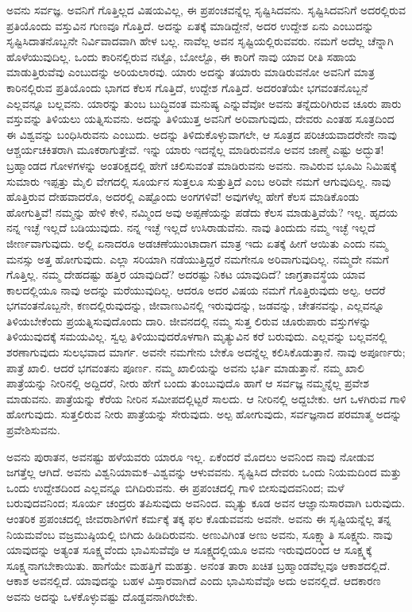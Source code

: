 ಅವನು ಸರ್ವಜ್ಞ. ಅವನಿಗೆ ಗೊತ್ತಿಲ್ಲದ ವಿಷಯವಿಲ್ಲ, ಈ ಪ್ರಪಂಚವನ್ನೆಲ್ಲ ಸೃಷ್ಟಿಸಿದವನು. ಸೃಷ್ಟಿಸಿದವನಿಗೆ ಅದರಲ್ಲಿರುವ ಪ್ರತಿಯೊಂದು ವಸ್ತುವಿನ ಗುಣವೂ ಗೊತ್ತಿದೆ. ಅದನ್ನು ಏತಕ್ಕೆ ಮಾಡಿದ್ದೇನೆ, ಅದರ ಉದ್ದೇಶ ಏನು ಎಂಬುದನ್ನು ಸೃಷ್ಟಿಸಿದಾತನೊಬ್ಬನೇ ನಿರ್ವಿವಾದವಾಗಿ ಹೇಳ ಬಲ್ಲ. ನಾವೆಲ್ಲ ಅವನ ಸೃಷ್ಟಿಯಲ್ಲಿರುವವರು. ನಮಗೆ ಅದೆಲ್ಲ ಚೆನ್ನಾಗಿ ಹೊಳೆಯುವುದಿಲ್ಲ. ಒಂದು ಕಾರಿನಲ್ಲಿರುವ ನಟ್ಟೊ, ಬೋಲ್ಟೊ, ಈ ಕಾರಿಗೆ ನಾವು ಯಾವ ರೀತಿ ಸಹಾಯ ಮಾಡುತ್ತಿರುವೆವು ಎಂಬುದನ್ನು ಅರಿಯಲಾರವು. ಯಾರು ಅದನ್ನು ತಯಾರು ಮಾಡಿರುವನೋ ಅವನಿಗೆ ಮಾತ್ರ ಕಾರಿನಲ್ಲಿರುವ ಪ್ರತಿಯೊಂದು ಭಾಗದ ಕೆಲಸ ಗೊತ್ತಿದೆ, ಉದ್ದೇಶ ಗೊತ್ತಿದೆ. ಅದರಂತೆಯೇ ಭಗವಂತನೊಬ್ಬನೆ ಎಲ್ಲವನ್ನೂ ಬಲ್ಲವನು. ಯಾರನ್ನು ತುಂಬ ಬುದ್ಧಿವಂತ ಮನುಷ್ಯ ಎನ್ನುವೆವೋ ಅವನು ತನ್ನೆದುರಿಗಿರುವ ಚೂರು ಪಾರು ವಸ್ತುವನ್ನು ತಿಳಿಯಲು ಯತ್ನಿಸುವನು. ಅದನ್ನು ತಿಳಿಯುತ್ತ ಅವನಿಗೆ ಅರಿವಾಗುವುದು, ದೇವರು ಎಂತಹ ಸೂತ್ರದಿಂದ ಈ ವಿಶ್ವವನ್ನು ಬಂಧಿಸಿರುವನು ಎಂಬುದು. ಅದನ್ನು ತಿಳಿದುಕೊಳ್ಳುವಾಗಲೇ, ಆ ಸೂತ್ರದ ಪರಿಚಯವಾದರೇನೇ ನಾವು ಆಶ್ಚರ್ಯಚಕಿತರಾಗಿ ಮೂಕರಾಗುತ್ತೇವೆ. ಇನ್ನು ಯಾರು ಇದನ್ನೆಲ್ಲ ಮಾಡಿರುವನೊ ಅವನ ಜಾಣ್ಮೆ ಎಷ್ಟು ಅದ್ಭುತ! ಬ್ರಹ್ಮಾಂಡದ ಗೋಳಗಳನ್ನು ಅಂತರಿಕ್ಷದಲ್ಲಿ ಹೇಗೆ ಚಲಿಸುವಂತೆ ಮಾಡಿರುವನು ಅವನು. ನಾವಿರುವ ಭೂಮಿ ನಿಮಿಷಕ್ಕೆ ಸುಮಾರು ಇಪ್ಪತ್ತು ಮೈಲಿ ವೇಗದಲ್ಲಿ ಸೂರ್ಯನ ಸುತ್ತಲೂ ಸುತ್ತುತ್ತಿದೆ ಎಂಬ ಅರಿವೇ ನಮಗೆ ಆಗುವುದಿಲ್ಲ. ನಾವು ಹೊತ್ತಿರುವ ದೇಹವಾದರೊ, ಅದರಲ್ಲಿ ಎಷ್ಟೊಂದು ಅಂಗಗಳಿವೆ! ಅವುಗಳೆಲ್ಲ ಹೇಗೆ ಕೆಲಸ ಮಾಡಿಕೊಂಡು ಹೋಗುತ್ತಿವೆ! ನಮ್ಮನ್ನು ಹೇಳಿ ಕೇಳಿ, ನಮ್ಮಿಂದ ಅವು ಅಪ್ಪಣೆಯನ್ನು ಪಡೆದು ಕೆಲಸ ಮಾಡುತ್ತಿವೆಯೆ? ಇಲ್ಲ. ಹೃದಯ ನನ್ನ ಇಚ್ಛೆ ಇಲ್ಲದೆ ಬಡಿಯುವುದು. ನನ್ನ ಇಚ್ಛೆ ಇಲ್ಲದೆ ಉಸಿರಾಡುವೆನು. ನಾವು ತಿಂದುದು ನಮ್ಮ ಇಚ್ಛೆ ಇಲ್ಲದೆ ಜೀರ್ಣವಾಗುವುದು. ಅಲ್ಲಿ ಏನಾದರೂ ಅಡಚಣೆಯುಂಟಾದಾಗ ಮಾತ್ರ ಇದು ಏತಕ್ಕೆ ಹೀಗೆ ಆಯಿತು ಎಂದು ನಮ್ಮ ಮನಸ್ಸು ಅತ್ತ ಹೋಗುವುದು. ಎಲ್ಲಾ ಸರಿಯಾಗಿ ನಡೆಯುತ್ತಿದ್ದರೆ ನಮಗೇನೂ ಅರಿವಾಗುವುದಿಲ್ಲ. ನಮ್ಮದೇ ನಮಗೆ ಗೊತ್ತಿಲ್ಲ. ನಮ್ಮ ದೇಹದಷ್ಟು ಹತ್ತಿರ ಯಾವುದಿದೆ? ಅದರಷ್ಟು ನಿಕಟ ಯಾವುದಿದೆ? ಜಾಗ್ರತಾವಸ್ಥೆಯ ಯಾವ ಕಾಲದಲ್ಲಿಯೂ ನಾವು ಅದನ್ನು ಮರೆಯುವುದಿಲ್ಲ. ಆದರೂ ಅದರ ವಿಷಯ ನಮಗೆ ಗೊತ್ತಿರುವುದು ಅಲ್ಪ. ಆದರೆ ಭಗವಂತನೊಬ್ಬನೇ, ಕಣದಲ್ಲಿರುವುದನ್ನು, ಜೀವಾಣುವಿನಲ್ಲಿ ಇರುವುದನ್ನು, ಜಡವನ್ನು, ಚೇತನವನ್ನು, ಎಲ್ಲವನ್ನೂ ತಿಳಿಯಬೇಕೆಂದು ಪ್ರಯತ್ನಿಸುವುದೊಂದು ದಾರಿ. ಜೀವನದಲ್ಲಿ ನಮ್ಮ ಸುತ್ತ ಲಿರುವ ಚೂರುಪಾರು ವಸ್ತುಗಳನ್ನು ತಿಳಿಯುವುದಕ್ಕೆ ಸಮಯವಿಲ್ಲ. ಸ್ವಲ್ಪ ತಿಳಿಯುವುದರೊಳಗಾಗಿ ಮೃತ್ಯುವಿನ ಕರೆ ಬರುವುದು. ಎಲ್ಲವನ್ನು ಬಲ್ಲವನಲ್ಲಿ ಶರಣಾಗುವುದು ಸುಲಭವಾದ ಮಾರ್ಗ. ಅವನೇ ನಮಗೇನು ಬೇಕೊ ಅದನ್ನೆಲ್ಲ ಕಲಿಸಿಕೊಡುತ್ತಾನೆ. ನಾವು ಅಪೂರ್ಣರು; ಪಾತ್ರೆ ಖಾಲಿ. ಆದರೆ ಭಗವಂತನು ಪೂರ್ಣ. ನಮ್ಮ ಖಾಲಿಯನ್ನು ಅವನು ಭರ್ತಿ ಮಾಡುತ್ತಾನೆ. ನಮ್ಮ ಖಾಲಿ ಪಾತ್ರೆಯನ್ನು ನೀರಿನಲ್ಲಿ ಅದ್ದಿದರೆ, ನೀರು ಹೇಗೆ ಬಂದು ತುಂಬುವುದೊ ಹಾಗೆ ಆ ಸರ್ವಜ್ಞ ನಮ್ಮನ್ನೆಲ್ಲ ಪ್ರವೇಶ ಮಾಡುವನು. ಪಾತ್ರೆಯನ್ನು ಕೆರೆಯ ನೀರಿನ ಸಮೀಪದಲ್ಲಿಟ್ಟರೆ ಸಾಲದು. ಆ ನೀರಿನಲ್ಲಿ ಅದ್ದಬೇಕು. ಆಗ ಒಳಗಿರುವ ಗಾಳಿ ಹೋಗುವುದು. ಸುತ್ತಲಿರುವ ನೀರು ಪಾತ್ರೆಯನ್ನು ಸೇರುವುದು. ಅಲ್ಪ ಹೋಗುವುದು, ಸರ್ವಜ್ಞನಾದ ಪರಮಾತ್ಮ ಅದನ್ನು ಪ್ರವೇಶಿಸುವನು.

ಅವನು ಪುರಾತನ, ಅವನಷ್ಟು ಹಳೆಯವರು ಯಾರೂ ಇಲ್ಲ. ಏಕೆಂದರೆ ಮೊದಲು ಅವನಿಂದ ನಾವು ನೋಡುವ ಜಗತ್ತೆಲ್ಲ ಆಗಿದೆ. ಅವನು ವಿಶ್ವನಿಯಾಮಕ–ವಿಶ್ವವನ್ನು ಆಳುವವನು. ಸೃಷ್ಟಿಸಿದ ದೇವರು ಒಂದು ನಿಯಮದಿಂದ ಮತ್ತು ಒಂದು ಉದ್ದೇಶದಿಂದ ಎಲ್ಲವನ್ನೂ ಬಿಗಿದಿರುವನು. ಈ ಪ್ರಪಂಚದಲ್ಲಿ ಗಾಳಿ ಬೀಸುವುದವನಿಂದ; ಮಳೆ ಬರುವುದವನಿಂದ; ಸೂರ್ಯ ಚಂದ್ರರು ತಪಿಸುವುದು ಅವನಿಂದ. ಮೃತ್ಯು ಕೂಡ ಅವನ ಆಜ್ಞಾನುಸಾರವಾಗಿ ಬರುವುದು. ಆಂತರಿಕ ಪ್ರಪಂಚದಲ್ಲಿ ಜೀವರಾಶಿಗಳಿಗೆ ಕರ್ಮಕ್ಕೆ ತಕ್ಕ ಫಲ ಕೊಡುವವನು ಅವನೇ. ಅವನು ಈ ಸೃಷ್ಟಿಯನ್ನೆಲ್ಲ ತನ್ನ ನಿಯಮವೆಂಬ ವಜ್ರಮುಷ್ಠಿಯಲ್ಲಿ ಬಿಗಿದು ಹಿಡಿದಿರುವನು. ಅಣುವಿಗಿಂತ ಅಣು ಅವನು, ಸೂಕ್ಷ್ಮಾತಿ ಸೂಕ್ಷ್ಮನು. ನಾವು ಯಾವುದನ್ನು ಅತ್ಯಂತ ಸೂಕ್ಷ್ಮವೆಂದು ಭಾವಿಸುವೆವೊ ಆ ಸೂಕ್ಷ್ಮದಲ್ಲಿಯೂ ಅವನು ಇರುವುದರಿಂದ ಆ ಸೂಕ್ಷ್ಮಕ್ಕೆ ಸೂಕ್ಷ್ಮನಾಗಬೇಕಾಯಿತು. ಹಾಗೆಯೇ ಮಹತ್ತಿಗೆ ಮಹತ್ತು. ಅನಂತ ತಾರಾ ಖಚಿತ ಬ್ರಹ್ಮಾಂಡವೆಲ್ಲವೂ ಆಕಾಶದಲ್ಲಿದೆ. ಆಕಾಶ ಅವನಲ್ಲಿದೆ. ಯಾವುದನ್ನು ಬಹಳ ವಿಸ್ತಾರವಾಗಿದೆ ಎಂದು ಭಾವಿಸುವೆವೊ ಅದು ಅವನಲ್ಲಿದೆ. ಆದಕಾರಣ ಅವನು ಅದನ್ನು ಒಳಕೊಳ್ಳುವಷ್ಟು ದೊಡ್ಡವನಾಗಿರಬೇಕು.

